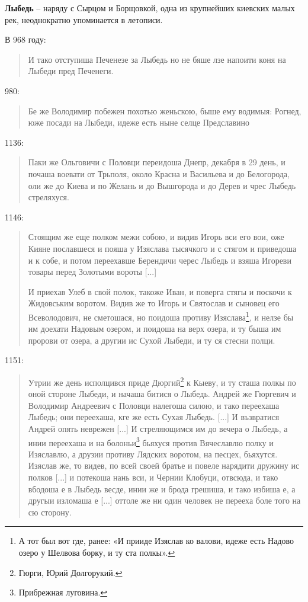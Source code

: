 \textbf{Лыбедь} – наряду с Сырцом и Борщовкой, одна из крупнейших киевских малых рек, неоднократно упоминается в летописи.

В 968 году:

\begin{quotation}
И тако отступиша Печенезе за Лыбедь но не бяше лзе напоити коня на Лыбеди пред Печенеги.
\end{quotation}

980:

\begin{quotation}
Бе же Володимир побежен похотью женьскою, быше ему водимыя: Рогнед, юже посади на Лыбеди, идеже есть ныне селце Предславино
\end{quotation}

1136:

\begin{quotation}
Паки же Ольговичи с Половци переидоша Днепр, декабря в 29 день, и почаша воевати от Трьполя, около Красна и Васильева и до Белогорода, оли же до Киева и по Желань и до Вышгорода и до Дерев и чрес Лыбедь стреляхуся.
\end{quotation}

1146:

\begin{quotation}
Стоящим же еще полком межи собою, и видив Игорь вси его вои, оже Кияне пославшеся и пояша у Изяслава тысячкого и с стягом и приведоша и к собе, и потом переехавше Берендичи черес Лыбедь и взяша Игореви товары перед Золотыми вороты [...]

И приехав Улеб в свой полок, такоже Иван, и поверга стягы и поскочи к Жидовським воротом. Видив же то Игорь и Святослав и сыновец его Всеволодович, не сметошася, но поидоша противу Изяслава\footnote{А тот был вот где, ранее: «И прииде Изяслав ко валови, идеже есть Надово озеро у Шелвова борку, и ту ста полкы».}, и нелзе бы им доехати Надовым озером, и поидоша на верх озера, и ту быша им пророви от озера, а другии ис Сухой Лыбеди, и ту ся стесни полци.
\end{quotation} 

1151:

\begin{quotation}
Утрии же день исполцився приде Дюргий\footnote{Гюрги, Юрий Долгорукий.} к Кыеву, и ту сташа полкы по оной стороне Лыбеди, и начаша битися о Лыбедь. Андрей же Гюргевич и Володимир Андреевич с Половци налегоша силою, и тако переехаша Лыбедь; они переехаша, кге же есть Сухая Лыбедь. [...]
И възвратися Андрей опять неврежен [...] И стреляющимся им до вечера о Лыбедь, а инии переехаша и на болоньи\footnote{Прибрежная луговина.} бьяхуся против Вячеславлю полку и Изяславлю, а друзии противу Лядских воротом, на песцех, бьяхутся. Изяслав же, то видев, по всей своей братье и повеле нарядити дружину ис полков [...] и потекоша нань вси, и Чернии Клобуци, отвсюда, и тако вбодоша е в Лыбедь весде, инии же и брода грешиша, и тако избиша е, а другыи изломаша е [...] оттоле же ни один человек не перееха боле того на сю сторону.
\end{quotation}

